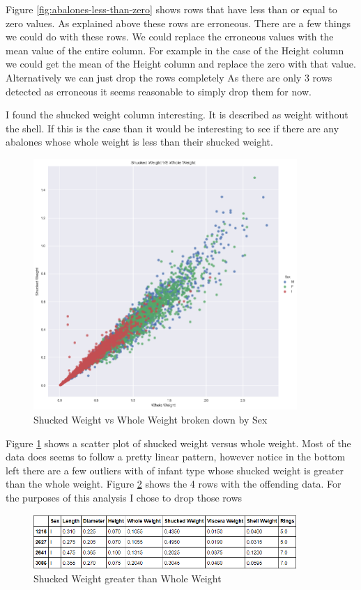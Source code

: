 Figure \ref{fig:abalones-less-than-zero} shows rows that have less than or equal to zero values. As explained above these rows are erroneous. There are a few things we could do with these rows. We could replace the erroneous values with the mean value of the entire column. For example in the case of the Height column we could get the mean of the Height column and replace the zero with that value. Alternatively we can just drop the rows completely As there are only 3 rows detected as erroneous it seems reasonable to simply drop them for now.

I found the shucked weight column interesting. It is described as weight without the shell. If this is the case than it would be interesting to see if there are any abalones whose whole weight is less than their shucked weight.

\begin{figure}[H]
  \centering
  \includegraphics[scale=0.5,width=100mm]{./images/abalone-shucked-weight-vs-whole.png}
  \caption{Shucked Weight vs Whole Weight broken down by Sex}
  \label{fig:shucked-vs-whole}
\end{figure}

Figure \ref{fig:shucked-vs-whole} shows a scatter plot of shucked weight versus whole weight. Most of the data does seems to follow a pretty linear pattern, however notice in the bottom left there are a few outliers with of infant type whose shucked weight is greater than the whole weight. Figure \ref{fig:shucked-greater-than-whole} shows the 4 rows with the offending data. For the purposes of this analysis I chose to drop those rows

\begin{figure}[H]
  \centering
  \includegraphics[scale=0.5,width=100mm]{./images/abalone-shucked-greater-than-whole.png}
  \caption{Shucked Weight greater than Whole Weight}
  \label{fig:shucked-greater-than-whole}
\end{figure}

